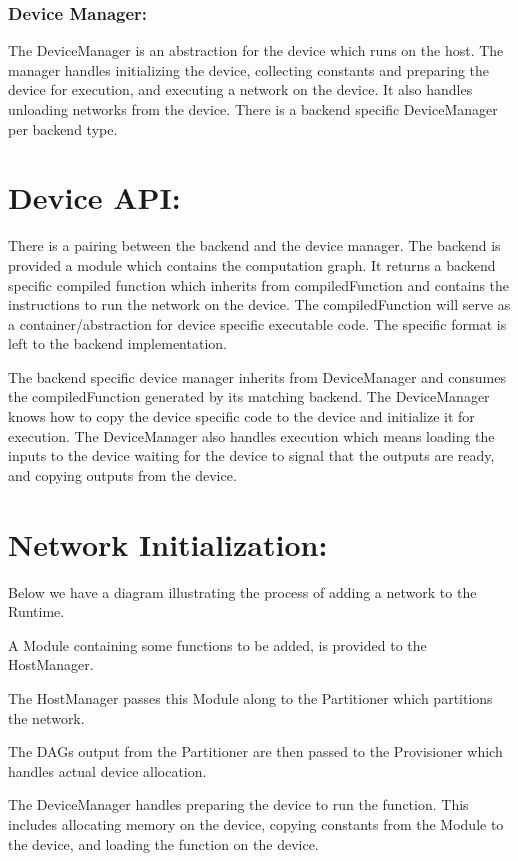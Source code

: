 \subsubsection*{Device Manager\+:}

The Device\+Manager is an abstraction for the device which runs on the host. The manager handles initializing the device, collecting constants and preparing the device for execution, and executing a network on the device. It also handles unloading networks from the device. There is a backend specific Device\+Manager per backend type.

\section*{Device A\+PI\+:}

There is a pairing between the backend and the device manager. The backend is provided a module which contains the computation graph. It returns a backend specific compiled function which inherits from compiled\+Function and contains the instructions to run the network on the device. The compiled\+Function will serve as a container/abstraction for device specific executable code. The specific format is left to the backend implementation.

The backend specific device manager inherits from Device\+Manager and consumes the compiled\+Function generated by its matching backend. The Device\+Manager knows how to copy the device specific code to the device and initialize it for execution. The Device\+Manager also handles execution which means loading the inputs to the device waiting for the device to signal that the outputs are ready, and copying outputs from the device.



\section*{Network Initialization\+:}

Below we have a diagram illustrating the process of adding a network to the Runtime.
\begin{DoxyItemize}
\item A Module containing some functions to be added, is provided to the Host\+Manager.
\item The Host\+Manager passes this Module along to the Partitioner which partitions the network.
\item The D\+A\+Gs output from the Partitioner are then passed to the Provisioner which handles actual device allocation.
\item The Device\+Manager handles preparing the device to run the function. This includes allocating memory on the device, copying constants from the Module to the device, and loading the function on the device.
\end{DoxyItemize}



